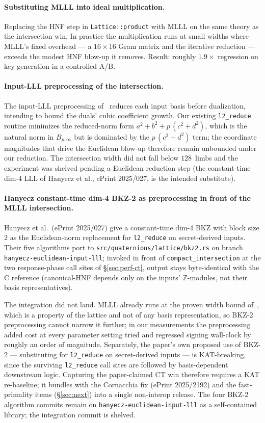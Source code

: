 \paragraph{Substituting MLLL into ideal multiplication.}
Replacing the HNF step in \texttt{Lattice::product} with MLLL on the
same theory as the intersection win.  In practice the multiplication
runs at small widths where MLLL's fixed overhead --- a $16 \times 16$
Gram matrix and the iterative reduction --- exceeds the modest HNF
blow-up it removes.  Result: roughly $1.9\times$ regression on
key generation in a controlled A/B.

\paragraph{Input-LLL preprocessing of the intersection.}
The input-LLL preprocessing of~\cite{KLY26} reduces each input basis
before dualization, intending to bound the duals' cubic coefficient
growth.  Our existing \texttt{l2\_reduce} routine minimizes the
reduced-norm form $a^2 + b^2 + p\,(c^2 + d^2)$, which is the natural
norm in $B_{p,\infty}$ but is dominated by the $p\,(c^2 + d^2)$ term;
the coordinate magnitudes that drive the Euclidean blow-up therefore
remain unbounded under our reduction.  The intersection width did not
fall below $128$~limbs and the experiment was shelved pending a
Euclidean reduction step (the constant-time dim-4 LLL of Hanyecz et
al., ePrint 2025/027, is the intended substitute).

\paragraph{Hanyecz constant-time dim-4 BKZ-2 as preprocessing in front
of the MLLL intersection.}
Hanyecz et al.\ (ePrint 2025/027) give a constant-time dim-4 BKZ
with block size $2$ as the Euclidean-norm replacement for
\texttt{l2\_reduce} on secret-derived inputs.  Their five algorithms
port to \texttt{src/quaternions/lattice/bkz2.rs} on branch
\texttt{hanyecz-euclidean-input-lll}; invoked in front of
\texttt{compact\_intersection} at the two response-phase call sites
of \S\ref{sec:perf-ct}, output stays byte-identical with the C
reference (canonical-HNF depends only on the inputs'
$\mathbb{Z}$-modules, not their basis representatives).

The integration did not land.  MLLL already runs at the proven
width bound of~\cite{KLY26}, which is a property of the lattice and
not of any basis representation, so BKZ-2 preprocessing cannot
narrow it further; in our measurements the preprocessing added cost
at every parameter setting tried and regressed signing wall-clock
by roughly an order of magnitude.  Separately, the paper's own
proposed use of BKZ-2 --- substituting for \texttt{l2\_reduce} on
secret-derived inputs --- is KAT-breaking, since the surviving
\texttt{l2\_reduce} call sites are followed by basis-dependent
downstream logic.  Capturing the paper-claimed CT win therefore
requires a KAT re-baseline; it bundles with the Cornacchia fix
(ePrint 2025/2192) and the fast-primality items (\S\ref{sec:next})
into a single non-interop release.  The four BKZ-2 algorithm
commits remain on \texttt{hanyecz-euclidean-input-lll} as a
self-contained library; the integration commit is shelved.

